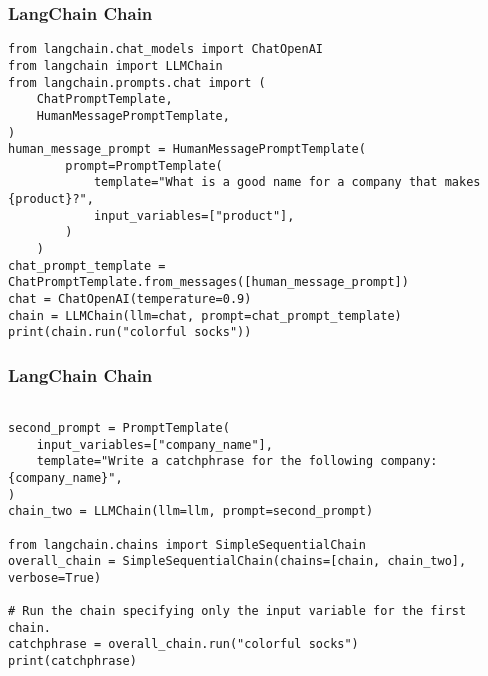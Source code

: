 \begin{frame}[fragile]\frametitle{LangChain Chain}


\begin{lstlisting}
from langchain.chat_models import ChatOpenAI
from langchain import LLMChain
from langchain.prompts.chat import (
    ChatPromptTemplate,
    HumanMessagePromptTemplate,
)
human_message_prompt = HumanMessagePromptTemplate(
        prompt=PromptTemplate(
            template="What is a good name for a company that makes {product}?",
            input_variables=["product"],
        )
    )
chat_prompt_template = ChatPromptTemplate.from_messages([human_message_prompt])
chat = ChatOpenAI(temperature=0.9)
chain = LLMChain(llm=chat, prompt=chat_prompt_template)
print(chain.run("colorful socks"))

\end{lstlisting}	  

\end{frame}


\begin{frame}[fragile]\frametitle{LangChain Chain}


\begin{lstlisting}

second_prompt = PromptTemplate(
    input_variables=["company_name"],
    template="Write a catchphrase for the following company: {company_name}",
)
chain_two = LLMChain(llm=llm, prompt=second_prompt)

from langchain.chains import SimpleSequentialChain
overall_chain = SimpleSequentialChain(chains=[chain, chain_two], verbose=True)

# Run the chain specifying only the input variable for the first chain.
catchphrase = overall_chain.run("colorful socks")
print(catchphrase)
\end{lstlisting}	  

\end{frame}


